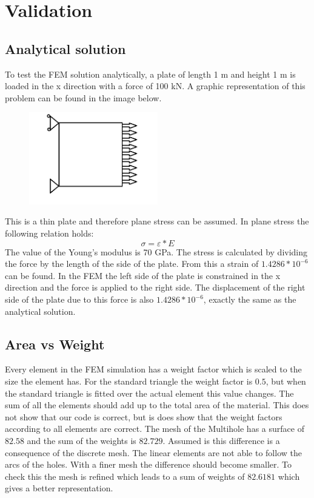\chapter{Validation}

\section{Analytical solution}
To test the FEM solution analytically, a plate of length 1 m and height 1 m is loaded in the x direction with a force of 100 kN. A graphic representation of this problem can be found in the image below.

\begin{figure}[h!]
    \parbox [t]{\textwidth}
        {
        \center
        \includegraphics[width=0.5\textwidth]{IMG/analytisch.png}
        }
\end{figure}

This is a thin plate and therefore plane stress can be assumed. In plane stress the following relation holds:
\[\sigma=\varepsilon*E\]
The value of the Young's modulus is 70 GPa. The stress is calculated by dividing the force by the length of the side of the plate. From this a strain of \(1.4286*10^{-6}\) can be found. 
In the FEM the left side of the plate is constrained in the x direction and the force is applied to the right side. The displacement of the right side of the plate due to this force is also \(1.4286*10^{-6}\), exactly the same as the analytical solution. 

\section{Area vs Weight}
Every element in the FEM simulation has a weight factor which is scaled to the size the element has. For the standard triangle the weight factor is $0.5$, but when the standard triangle is fitted over the actual element this value changes. The sum of all the elements should add up to the total area of the material. This does not show that our code is correct, but is does show that the weight factors according to all elements are correct. The mesh of the Multihole has a surface of $82.58$ and the sum of the weights is $82.729$. Assumed is this difference is a consequence of the discrete mesh. The linear elements are not able to follow the arcs of the holes. With a finer mesh the difference should become smaller. To check this the mesh is refined which leads to a sum of weights of $82.6181$ which gives a better representation.
